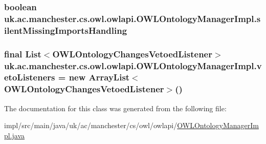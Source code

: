 \hypertarget{classuk_1_1ac_1_1manchester_1_1cs_1_1owl_1_1owlapi_1_1_o_w_l_ontology_manager_impl_a6c32b7411e99b98617e364a5782748f1}{
\subsubsection[{silent\-Missing\-Imports\-Handling}]{\setlength{\rightskip}{0pt plus 5cm}boolean uk.\-ac.\-manchester.\-cs.\-owl.\-owlapi.\-O\-W\-L\-Ontology\-Manager\-Impl.\-silent\-Missing\-Imports\-Handling\hspace{0.3cm}{\ttfamily [protected]}}}\label{classuk_1_1ac_1_1manchester_1_1cs_1_1owl_1_1owlapi_1_1_o_w_l_ontology_manager_impl_a6c32b7411e99b98617e364a5782748f1}
\hypertarget{classuk_1_1ac_1_1manchester_1_1cs_1_1owl_1_1owlapi_1_1_o_w_l_ontology_manager_impl_ad6b6e72c74d97b8c46592a6efb8b7f14}{
\subsubsection[{veto\-Listeners}]{\setlength{\rightskip}{0pt plus 5cm}final List$<${\bf O\-W\-L\-Ontology\-Changes\-Vetoed\-Listener}$>$ uk.\-ac.\-manchester.\-cs.\-owl.\-owlapi.\-O\-W\-L\-Ontology\-Manager\-Impl.\-veto\-Listeners = new Array\-List$<${\bf O\-W\-L\-Ontology\-Changes\-Vetoed\-Listener}$>$()\hspace{0.3cm}{\ttfamily [private]}}}\label{classuk_1_1ac_1_1manchester_1_1cs_1_1owl_1_1owlapi_1_1_o_w_l_ontology_manager_impl_ad6b6e72c74d97b8c46592a6efb8b7f14}


The documentation for this class was generated from the following file\-:\begin{DoxyCompactItemize}
\item 
impl/src/main/java/uk/ac/manchester/cs/owl/owlapi/\hyperlink{_o_w_l_ontology_manager_impl_8java}{O\-W\-L\-Ontology\-Manager\-Impl.\-java}\end{DoxyCompactItemize}
